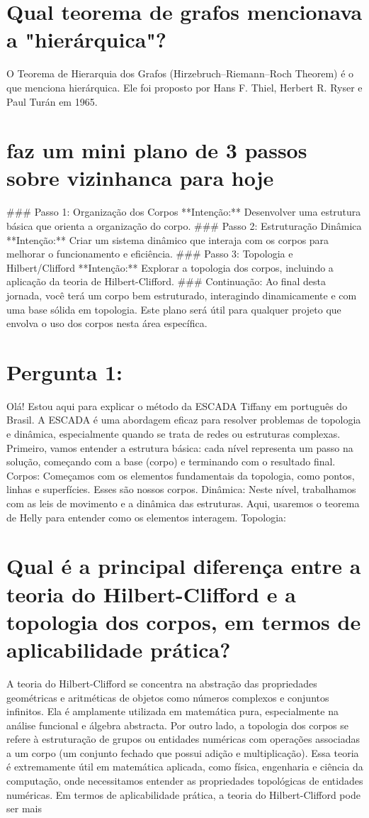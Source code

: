 \documentclass[11pt,a4paper]{article}
\begin{document}
\section{Qual teorema de grafos mencionava a "hierárquica"?}
O Teorema de Hierarquia dos Grafos (Hirzebruch–Riemann–Roch Theorem) é o que menciona hierárquica. Ele foi proposto por Hans F. Thiel, Herbert R. Ryser e Paul Turán em 1965.

\section{faz um mini plano de 3 passos sobre vizinhanca para hoje}
\#\#\# Passo 1: Organização dos Corpos **Intenção:** Desenvolver uma estrutura básica que orienta a organização do corpo. \#\#\# Passo 2: Estruturação Dinâmica **Intenção:** Criar um sistema dinâmico que interaja com os corpos para melhorar o funcionamento e eficiência. \#\#\# Passo 3: Topologia e Hilbert/Clifford **Intenção:** Explorar a topologia dos corpos, incluindo a aplicação da teoria de Hilbert-Clifford. \#\#\# Continuação: Ao final desta jornada, você terá um corpo bem estruturado, interagindo dinamicamente e com uma base sólida em topologia. Este plano será útil para qualquer projeto que envolva o uso dos corpos nesta área específica.

\section{Pergunta 1:}
Olá! Estou aqui para explicar o método da ESCADA Tiffany em português do Brasil. A ESCADA é uma abordagem eficaz para resolver problemas de topologia e dinâmica, especialmente quando se trata de redes ou estruturas complexas. Primeiro, vamos entender a estrutura básica: cada nível representa um passo na solução, começando com a base (corpo) e terminando com o resultado final. Corpos: Começamos com os elementos fundamentais da topologia, como pontos, linhas e superfícies. Esses são nossos corpos. Dinâmica: Neste nível, trabalhamos com as leis de movimento e a dinâmica das estruturas. Aqui, usaremos o teorema de Helly para entender como os elementos interagem. Topologia:

\section{Qual é a principal diferença entre a teoria do Hilbert-Clifford e a topologia dos corpos, em termos de aplicabilidade prática?}
A teoria do Hilbert-Clifford se concentra na abstração das propriedades geométricas e aritméticas de objetos como números complexos e conjuntos infinitos. Ela é amplamente utilizada em matemática pura, especialmente na análise funcional e álgebra abstracta. Por outro lado, a topologia dos corpos se refere à estruturação de grupos ou entidades numéricas com operações associadas a um corpo (um conjunto fechado que possui adição e multiplicação). Essa teoria é extremamente útil em matemática aplicada, como física, engenharia e ciência da computação, onde necessitamos entender as propriedades topológicas de entidades numéricas. Em termos de aplicabilidade prática, a teoria do Hilbert-Clifford pode ser mais
\end{document}
